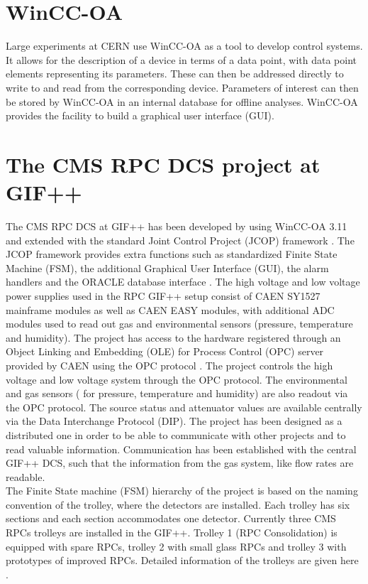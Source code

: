 \section{WinCC-OA}\label{sec:wincc}
Large experiments at CERN use WinCC-OA as a tool to develop control systems. It allows for the description of a device in terms of a data point, with data point elements representing its parameters. These can then be addressed directly to write to and read from the corresponding device. Parameters of interest can then be stored by WinCC-OA in an internal database for offline analyses. WinCC-OA provides the facility to build a graphical user interface (GUI).

\section{The CMS RPC DCS project at GIF++}\label{sec:rpc_proj}
The CMS RPC DCS at GIF++ has been developed by using WinCC-OA 3.11 and extended with the standard Joint Control Project (JCOP) framework \cite{jcop}. The JCOP framework provides extra functions such as standardized Finite State Machine (FSM), the additional Graphical User Interface (GUI), the alarm handlers and the ORACLE database interface \cite{g-polese}. The high voltage and low voltage power supplies used in the RPC GIF++ setup consist of CAEN SY1527 mainframe modules as well as CAEN EASY modules, with additional ADC modules used to read out gas and environmental sensors (pressure, temperature and humidity). The project has access to the hardware registered through an Object Linking and Embedding (OLE) for Process Control (OPC) server provided by CAEN using the OPC protocol \cite{opc}. The project controls the high voltage and low voltage system through the OPC protocol. The environmental and gas sensors ( for pressure, temperature and humidity) are also readout via the OPC protocol. The source status and attenuator values are available centrally via the Data Interchange Protocol (DIP). The project has been designed as a distributed one in order to be able to communicate with other projects and to read valuable information. Communication has been established with the central GIF++ DCS, such that the information from the gas system, like flow rates are readable.\\
The Finite State machine (FSM) hierarchy of the project is based on the naming convention of the trolley, where the detectors are installed. Each trolley has six sections and each section accommodates one detector. Currently three CMS RPCs trolleys are installed in the GIF++. Trolley 1 (RPC Consolidation) is equipped with spare RPCs, trolley 2 with small glass RPCs and trolley 3 with prototypes of improved RPCs. Detailed information of the trolleys are given here \cite{salvador}. 
